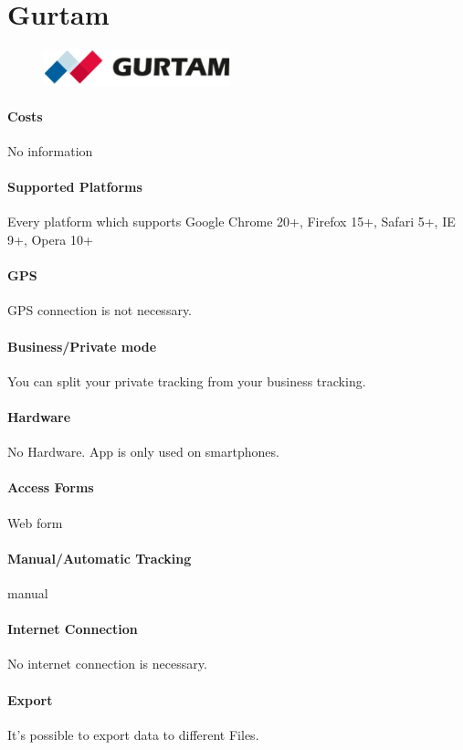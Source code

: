 \section{Gurtam}
\begin{figure}
  \begin{center}
    \includegraphics[width=0.48\textwidth]{bilder/gurtam}
  \end{center}
\end{figure}
\paragraph{Costs} No information 
\paragraph{Supported Platforms} Every platform which supports  Google Chrome 20+, Firefox 15+, Safari 5+, IE 9+, Opera 10+
\paragraph{GPS} GPS connection is not necessary.
\paragraph{Business/Private mode} You can split your private tracking from your business tracking.
\paragraph{Hardware}No Hardware. App is only used on smartphones.
\paragraph{Access Forms}Web form
\paragraph{Manual/Automatic Tracking}manual
\paragraph{Internet Connection}No internet connection is necessary.
\paragraph{Export}It’s possible to export data to different Files.
